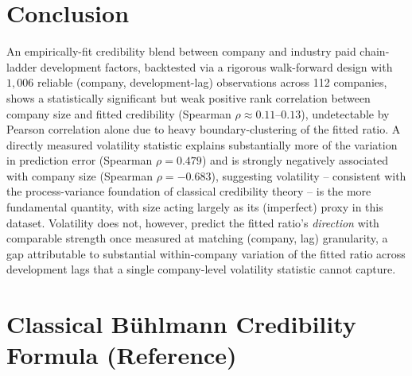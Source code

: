 \documentclass[11pt]{article}
\begin{document}
\section{Conclusion}

An empirically-fit credibility blend between company and industry paid chain-ladder development
factors, backtested via a rigorous walk-forward design with $1{,}006$ reliable (company,
development-lag) observations across 112 companies, shows a statistically significant but weak
positive rank correlation between company size and fitted credibility (Spearman $\rho \approx
0.11$--$0.13$), undetectable by Pearson correlation alone due to heavy boundary-clustering of the
fitted ratio. A directly measured volatility statistic explains substantially more of the
variation in prediction error (Spearman $\rho=0.479$) and is strongly negatively associated with
company size (Spearman $\rho=-0.683$), suggesting volatility -- consistent with the process-variance
foundation of classical credibility theory -- is the more fundamental quantity, with size acting
largely as its (imperfect) proxy in this dataset. Volatility does not, however, predict the fitted
ratio's \emph{direction} with comparable strength once measured at matching (company, lag)
granularity, a gap attributable to substantial within-company variation of the fitted ratio across
development lags that a single company-level volatility statistic cannot capture.

\appendix
\section{Classical Bühlmann Credibility Formula (Reference)}
\label{app:buhlmann}
\end{document}
